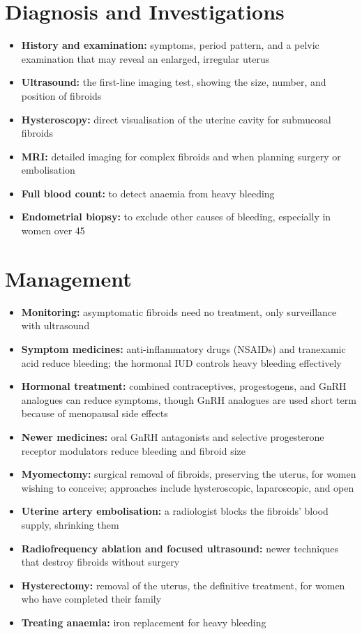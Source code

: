 \section*{Diagnosis and Investigations}
\begin{itemize}
    \item \textbf{History and examination:} symptoms, period pattern, and a pelvic examination that may reveal an enlarged, irregular uterus
    \item \textbf{Ultrasound:} the first-line imaging test, showing the size, number, and position of fibroids
    \item \textbf{Hysteroscopy:} direct visualisation of the uterine cavity for submucosal fibroids
    \item \textbf{MRI:} detailed imaging for complex fibroids and when planning surgery or embolisation
    \item \textbf{Full blood count:} to detect anaemia from heavy bleeding
    \item \textbf{Endometrial biopsy:} to exclude other causes of bleeding, especially in women over 45
\end{itemize}

\section*{Management}
\begin{itemize}
    \item \textbf{Monitoring:} asymptomatic fibroids need no treatment, only surveillance with ultrasound
    \item \textbf{Symptom medicines:} anti-inflammatory drugs (NSAIDs) and tranexamic acid reduce bleeding; the hormonal IUD controls heavy bleeding effectively
    \item \textbf{Hormonal treatment:} combined contraceptives, progestogens, and GnRH analogues can reduce symptoms, though GnRH analogues are used short term because of menopausal side effects
    \item \textbf{Newer medicines:} oral GnRH antagonists and selective progesterone receptor modulators reduce bleeding and fibroid size
    \item \textbf{Myomectomy:} surgical removal of fibroids, preserving the uterus, for women wishing to conceive; approaches include hysteroscopic, laparoscopic, and open
    \item \textbf{Uterine artery embolisation:} a radiologist blocks the fibroids' blood supply, shrinking them
    \item \textbf{Radiofrequency ablation and focused ultrasound:} newer techniques that destroy fibroids without surgery
    \item \textbf{Hysterectomy:} removal of the uterus, the definitive treatment, for women who have completed their family
    \item \textbf{Treating anaemia:} iron replacement for heavy bleeding
\end{itemize}

